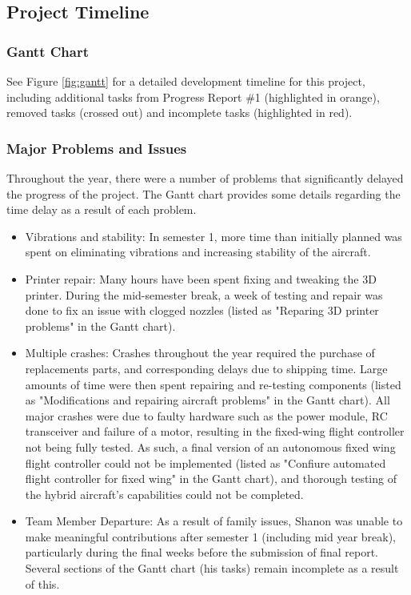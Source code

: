 \subsection{Project Timeline}
\subsubsection*{Gantt Chart}
\label{sec:gantt}
See Figure \ref{fig:gantt} for a detailed development timeline for this project, including additional tasks from Progress Report \#1 (highlighted in orange), removed tasks (crossed out) and incomplete tasks (highlighted in red). 

\subsubsection*{Major Problems and Issues}
Throughout the year, there were a number of problems that significantly delayed the progress of the project. The Gantt chart provides some details regarding the time delay as a result of each problem.
\begin{itemize}
	\item Vibrations and stability: In semester 1, more time than initially planned was spent on eliminating vibrations and increasing stability of the aircraft. 
	
	\item Printer repair: Many hours have been spent fixing and tweaking the 3D printer.  During the mid-semester break, a week of testing and repair was done to fix an issue with clogged nozzles (listed as "Reparing 3D printer problems" in the Gantt chart). 
	
	\item Multiple crashes: Crashes throughout the year required the purchase of replacements parts, and corresponding delays due to shipping time. Large amounts of time were then spent repairing and re-testing components (listed as "Modifications and repairing aircraft problems" in the Gantt chart). All major crashes were due to faulty hardware such as the power module, RC transceiver and failure of a motor, resulting in the fixed-wing flight controller not being fully tested. As such, a final version of an autonomous fixed wing flight controller could not be implemented (listed as "Confiure automated flight controller for fixed wing" in the Gantt chart), and thorough testing of the hybrid aircraft's capabilities could not be completed. 
	
	\item Team Member Departure: As a result of family issues, Shanon was unable to make meaningful contributions after semester 1 (including mid year break), particularly during the final weeks before the submission of final report. Several sections of the Gantt chart (his tasks) remain incomplete as a result of this.
\end{itemize}

